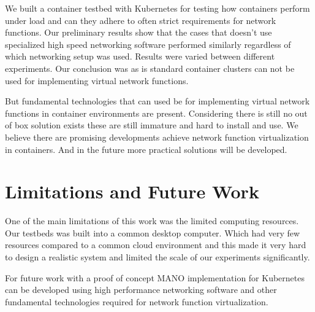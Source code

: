 \documentclass[12pt,oneandhalf,chaparabic,ceng,ms,eng,oneside,pntc]{gsufbe}
\begin{document}
We built a container testbed with Kubernetes for testing how containers perform under load and can they
adhere to often strict requirements for network functions. Our preliminary results show that the cases
that doesn't use specialized high speed networking software performed similarly regardless of which
networking setup was used. Results were varied between different experiments. Our conclusion was as is
standard container clusters can not be used for implementing virtual network functions.

But fundamental technologies that can used be for implementing virtual network functions in
container environments are present. Considering there is still no out of box solution exists these are
still immature and hard to install and use. We believe there are promising developments achieve network
function virtualization in containers. And in the future more practical solutions will be developed.

\section{Limitations and Future Work}
One of the main limitations of this work was the limited computing resources. Our testbeds was 
built into a common desktop computer. Which had very few resources compared to a common cloud
environment and this made it very hard to design a realistic system and limited the scale of our
experiments significantly.

For future work with a proof of concept MANO implementation for Kubernetes can be developed using high
performance networking software and other fundamental technologies required for network function
virtualization.

\appendix
\thispagestyle{empty}

%
\end{document}
